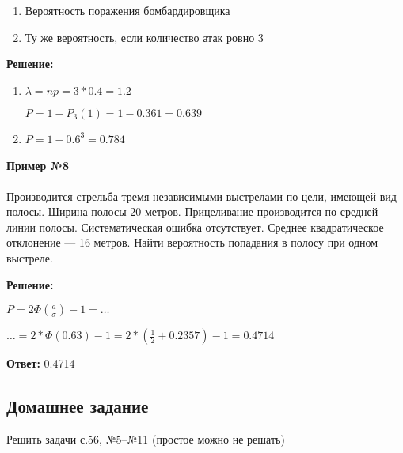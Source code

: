 \documentclass{article}
\begin{document}
\begin{enumerate}
    \item Вероятность поражения бомбардировщика
    \item Ту же вероятность, если количество атак ровно $3$
\end{enumerate}

\textbf{Решение:}

\begin{enumerate}
    \item $\lambda = np = 3 * 0.4 = 1.2$
    
    $P = 1 - P_3(1) = 1 - 0.361 = 0.639$ 
    \item $P = 1 - 0.6^3 = 0.784$ 
\end{enumerate}

\paragraph{Пример №8}

Производится стрельба тремя независимыми выстрелами по цели, имеющей вид полосы. Ширина полосы $20$ метров. Прицеливание производится по средней линии полосы. Систематическая ошибка отсутствует. Среднее квадратическое отклонение — 16 метров. Найти вероятность попадания в полосу при одном выстреле.

\textbf{Решение:}

$P = 2 \Phi (\frac{a}{\sigma}) - 1 = \dots$

$\dots = 2 * \Phi (0.63) - 1 = 2 * (\frac{1}{2} + 0.2357) - 1 = 0.4714$

\textbf{Ответ:} 0.4714

\subsection{Домашнее задание}

Решить задачи с.56, №5–№11 (простое можно не решать)
\end{document}
